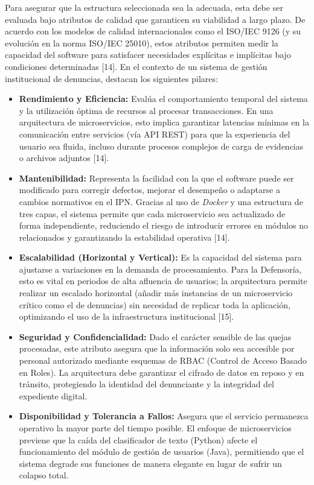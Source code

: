 Para asegurar que la estructura seleccionada sea la adecuada, esta debe ser evaluada bajo atributos de calidad que garanticen su viabilidad a largo plazo. De acuerdo con los modelos de calidad internacionales como el ISO/IEC 9126 (y su evolución en la norma ISO/IEC 25010), estos atributos permiten medir la capacidad del software para satisfacer necesidades explícitas e implícitas bajo condiciones determinadas [14]. En el contexto de un sistema de gestión institucional de denuncias, destacan los siguientes pilares:

\begin{itemize}
    \item \textbf{Rendimiento y Eficiencia:} Evalúa el comportamiento temporal del sistema y la utilización óptima de recursos al procesar transacciones. En una arquitectura de microservicios, esto implica garantizar latencias mínimas en la comunicación entre servicios (vía API REST) para que la experiencia del usuario sea fluida, incluso durante procesos complejos de carga de evidencias o archivos adjuntos [14].
    
    \item \textbf{Mantenibilidad:} Representa la facilidad con la que el software puede ser modificado para corregir defectos, mejorar el desempeño o adaptarse a cambios normativos en el IPN. Gracias al uso de \textit{Docker} y una estructura de tres capas, el sistema permite que cada microservicio sea actualizado de forma independiente, reduciendo el riesgo de introducir errores en módulos no relacionados y garantizando la estabilidad operativa [14].

    \item \textbf{Escalabilidad (Horizontal y Vertical):} Es la capacidad del sistema para ajustarse a variaciones en la demanda de procesamiento. Para la Defensoría, esto es vital en periodos de alta afluencia de usuarios; la arquitectura permite realizar un escalado horizontal (añadir más instancias de un microservicio crítico como el de denuncias) sin necesidad de replicar toda la aplicación, optimizando el uso de la infraestructura institucional [15].

    \item \textbf{Seguridad y Confidencialidad:} Dado el carácter sensible de las quejas procesadas, este atributo asegura que la información solo sea accesible por personal autorizado mediante esquemas de RBAC (Control de Acceso Basado en Roles). La arquitectura debe garantizar el cifrado de datos en reposo y en tránsito, protegiendo la identidad del denunciante y la integridad del expediente digital.

    \item \textbf{Disponibilidad y Tolerancia a Fallos:} Asegura que el servicio permanezca operativo la mayor parte del tiempo posible. El enfoque de microservicios previene que la caída del clasificador de texto (Python) afecte el funcionamiento del módulo de gestión de usuarios (Java), permitiendo que el sistema degrade sus funciones de manera elegante en lugar de sufrir un colapso total.
\end{itemize}

